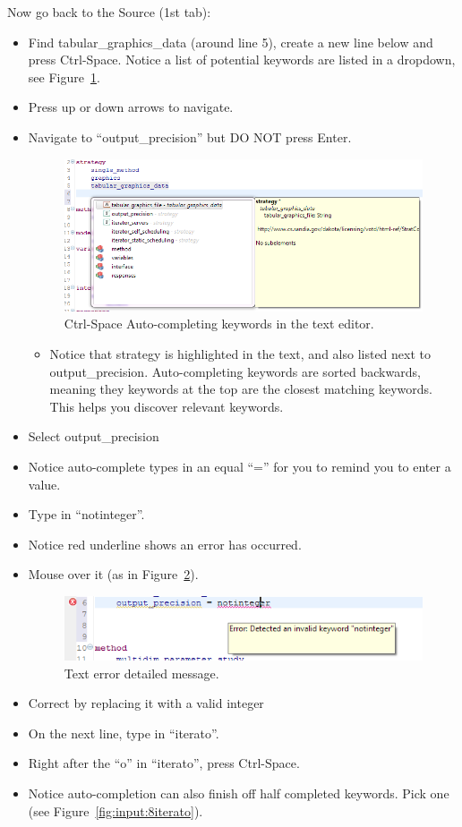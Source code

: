 Now go back to the Source (1st tab):
\begin{itemize}
\item Find tabular\_graphics\_data (around line 5), create a new line
  below and press Ctrl-Space. Notice a list of potential keywords are
  listed in a dropdown, see Figure~\ref{fig:input:6Autocomplete}.
\item Press up or down arrows to navigate.
\item Navigate to ``output\_precision'' but DO NOT press Enter.
\begin{figure}[htbp]
  \centering
  \includegraphics[scale=0.6]{images/6Autocomplete}
  \caption{Ctrl-Space Auto-completing keywords in the text editor.}
  \label{fig:input:6Autocomplete}
\end{figure}
\begin{itemize}
\item Notice that strategy is highlighted in the text, and also listed
  next to output\_precision. Auto-completing keywords are sorted
  backwards, meaning they keywords at the top are the closest matching
  keywords. This helps you discover relevant keywords.
\end{itemize}
\item Select output\_precision
\item Notice auto-complete types in an equal ``='' for you to remind
  you to enter a value.
\item Type in ``notinteger''.
\item Notice red underline shows an error has occurred.
\item Mouse over it (as in Figure~\ref{fig:input:7texterror}).
\begin{figure}[htbp]
  \centering
  \includegraphics[scale=0.6]{images/7texterror}
  \caption{Text error detailed message.}
  \label{fig:input:7texterror}
\end{figure}
\item Correct by replacing it with a valid integer
\item On the next line, type in ``iterato''.
\item Right after the ``o'' in ``iterato'', press Ctrl-Space.
\item Notice auto-completion can also finish off half completed
  keywords. Pick one (see Figure~\ref{fig:input:8iterato}).
\end{itemize}
